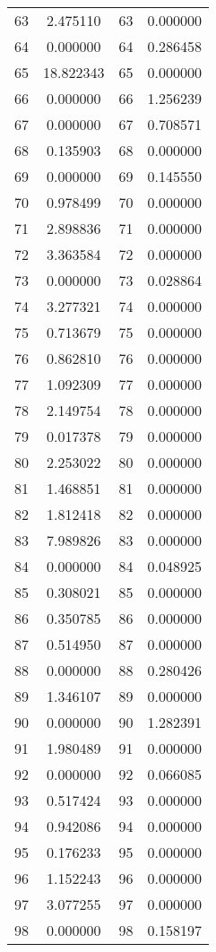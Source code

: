 \documentclass[12pt]{article}
\begin{document}
\begin{longtable}{@{}cccc@{}}
63 & 2.475110 & 63 & 0.000000 \\
64 & 0.000000 & 64 & 0.286458 \\
65 & 18.822343 & 65 & 0.000000 \\
66 & 0.000000 & 66 & 1.256239 \\
67 & 0.000000 & 67 & 0.708571 \\
68 & 0.135903 & 68 & 0.000000 \\
69 & 0.000000 & 69 & 0.145550 \\
70 & 0.978499 & 70 & 0.000000 \\
71 & 2.898836 & 71 & 0.000000 \\
72 & 3.363584 & 72 & 0.000000 \\
73 & 0.000000 & 73 & 0.028864 \\
74 & 3.277321 & 74 & 0.000000 \\
75 & 0.713679 & 75 & 0.000000 \\
76 & 0.862810 & 76 & 0.000000 \\
77 & 1.092309 & 77 & 0.000000 \\
78 & 2.149754 & 78 & 0.000000 \\
79 & 0.017378 & 79 & 0.000000 \\
80 & 2.253022 & 80 & 0.000000 \\
81 & 1.468851 & 81 & 0.000000 \\
82 & 1.812418 & 82 & 0.000000 \\
83 & 7.989826 & 83 & 0.000000 \\
84 & 0.000000 & 84 & 0.048925 \\
85 & 0.308021 & 85 & 0.000000 \\
86 & 0.350785 & 86 & 0.000000 \\
87 & 0.514950 & 87 & 0.000000 \\
88 & 0.000000 & 88 & 0.280426 \\
89 & 1.346107 & 89 & 0.000000 \\
90 & 0.000000 & 90 & 1.282391 \\
91 & 1.980489 & 91 & 0.000000 \\
92 & 0.000000 & 92 & 0.066085 \\
93 & 0.517424 & 93 & 0.000000 \\
94 & 0.942086 & 94 & 0.000000 \\
95 & 0.176233 & 95 & 0.000000 \\
96 & 1.152243 & 96 & 0.000000 \\
97 & 3.077255 & 97 & 0.000000 \\
98 & 0.000000 & 98 & 0.158197 \\

\end{longtable}
\end{document}
